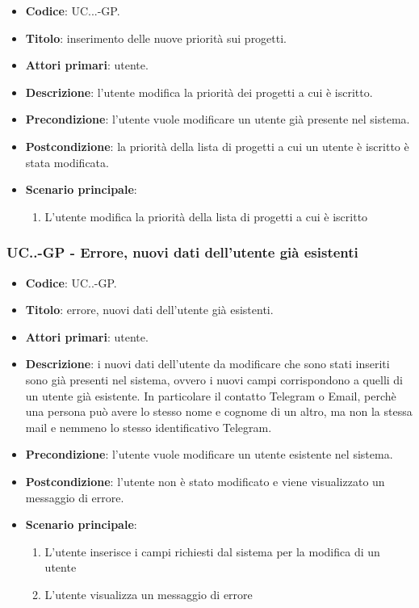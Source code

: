             \begin{itemize}
                \item \textbf{Codice}: UC\theuccount.\thesubuccount.\thesubsubuccount.\thesubsubsubuccount-GP.
                \item \textbf{Titolo}: inserimento delle nuove priorità sui progetti.
                \item \textbf{Attori primari}: utente.
                \item \textbf{Descrizione}: l'utente modifica la priorità dei progetti a cui è iscritto.
                \item \textbf{Precondizione}: l'utente vuole modificare un utente già presente nel sistema.
                \item \textbf{Postcondizione}: la priorità della lista di progetti a cui un utente è iscritto è stata modificata.
                \item \textbf{Scenario principale}:
                \begin{enumerate}
                    \item L'utente modifica la priorità della lista di progetti a cui è iscritto
                \end{enumerate}
            \end{itemize}
			
		\subsubsection{UC\theuccount.\thesubuccount.\thesubsubuccount-GP - Errore, nuovi dati dell'utente già esistenti}
		
		\begin{itemize}
			\item \textbf{Codice}: UC\theuccount.\thesubuccount.\thesubsubuccount-GP.
			\item \textbf{Titolo}: errore, nuovi dati dell'utente già esistenti.
			\item \textbf{Attori primari}: utente.
			\item \textbf{Descrizione}: i nuovi dati dell'utente da modificare che sono stati inseriti sono già presenti nel sistema, ovvero i nuovi campi corrispondono a quelli di un utente già esistente. In particolare il contatto Telegram o Email, perchè una persona può avere lo stesso nome e cognome di un altro, ma non la stessa mail e nemmeno lo stesso identificativo Telegram.
			\item \textbf{Precondizione}: l'utente vuole modificare un utente esistente nel sistema.
			\item \textbf{Postcondizione}: l'utente non è stato modificato e viene visualizzato un messaggio di errore.
			\item \textbf{Scenario principale}:
			\begin{enumerate}
				\item L'utente inserisce i campi richiesti dal sistema per la modifica di un utente
				\item L'utente visualizza un messaggio di errore
			\end{enumerate}
		\end{itemize}
